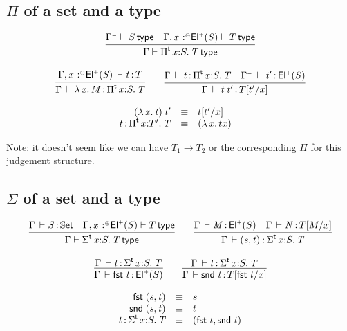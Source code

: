 \documentclass[11pt]{article}
\theoremstyle{plain}
\begin{document}
\subsection{$\Pi$ of a set and a type}

\[
\begin{array}{c}
\infer{\wftp{\Gamma}{\pitp{x}{S}{T}}}
      {\wftp{\Gamma^\con}{S} &
        \wftp{\Gamma, \vstptm {x}{\conc}{\Elp{S}}}{T}}
\\ \\
\infer{\oftp{\Gamma}{\ulam{x}{M}}{\pitp x {S} {T}}}
      {\oftp{\Gamma, \tptmv x {\conc} {\Elp{S}} }{t}{T}}
\qquad
\infer{\oftp{\Gamma}{\app t {t'}}{\subst T {t'} x}}
      {\oftp{\Gamma}{t}{\pitp{x}{S}{T}} &
        \oftp{\Gamma^\con}{t'}{\Elp{S}}}
\end{array}
\]

\[
\begin{array}{rcll}
\mathit{({\lambda\,x.\,t}) \: t'} & \equiv & t [ t' / x ] \\
t \, \mathit{:} \, \textnormal{$\Pi$}^{\mathsf{t}}\,x \mathit{:} T'.\,\mathit{T} & \equiv & {({\lambda\,x.\,t}{x})} &
\end{array} \\
\]

Note: it doesn't seem like we can have $T_1 \to T_2$ or the
corresponding $\Pi$ for this judgement structure.

\subsection{$\Sigma$ of a set and a type}

\[
\begin{array}{c}
\infer{\wftp{\Gamma}{\sigmatp{x}{S}{T}}}
      {\oftp{\Gamma}{S}{\types} &
        \wftp{\Gamma, \tptmv{x}{\coc}{\Elp{S}}}{T}}
\qquad
\infer{\oftp{\Gamma}{\pair{s}{t}}{\sigmatp x S T}}
      {\oftp{\Gamma}{M}{\Elp{S}} &
       \oftp{\Gamma}{N}{\subst{T}{M}x}}
\\ \\
\infer{\oftp{\Gamma}{\fst t}{\Elp{S}}}
      {\oftp{\Gamma}{t}{\sigmatp{x}{S}{T}}}
\qquad
\infer{\oftp{\Gamma}{\snd t}{\subst{T}{\fst t}{x}}}
      {\oftp{\Gamma}{t}{\sigmatp{x}{S}{T}}}
\end{array}
\]

\[
\begin{array}{rcll}
\mathit{\mathsf{fst}_{} \: \mathit{(s,t)_{}}} & \equiv & s \\
\mathit{\mathsf{snd}_{} \: \mathit{(s,t)_{}}} & \equiv & t \\
t \, \mathit{:} \, \textnormal{$\Sigma$}^{\mathsf{t}}\,x \mathit{:} S.\,\mathit{T} & \equiv & \mathit{(\mathit{\mathsf{fst}_{} \: t},\mathit{\mathsf{snd}_{} \: t})_{}}
\end{array}
\]
\end{document}
